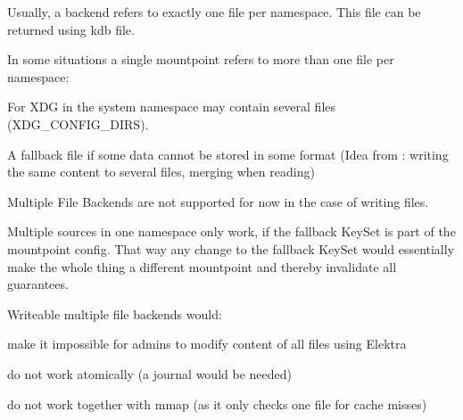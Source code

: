 Usually, a backend refers to exactly one file per namespace. This file can be returned using {\ttfamily kdb file}.

In some situations a single mountpoint refers to more than one file per namespace\+:


\begin{DoxyItemize}
\item For X\+DG in the {\ttfamily system} namespace may contain several files (X\+D\+G\+\_\+\+C\+O\+N\+F\+I\+G\+\_\+\+D\+I\+RS).
\item A fallback file if some data cannot be stored in some format (Idea from \+: writing the same content to several files, merging when reading)
\end{DoxyItemize}

Multiple File Backends are not supported for now in the case of writing files.

Multiple sources in one namespace only work, if the fallback Key\+Set is part of the mountpoint config. That way any change to the fallback Key\+Set would essentially make the whole thing a different mountpoint and thereby invalidate all guarantees.

Writeable multiple file backends would\+:


\begin{DoxyItemize}
\item make it impossible for admins to modify content of all files using Elektra
\item do not work atomically (a journal would be needed)
\item do not work together with mmap (as it only checks one file for cache misses)
\end{DoxyItemize}